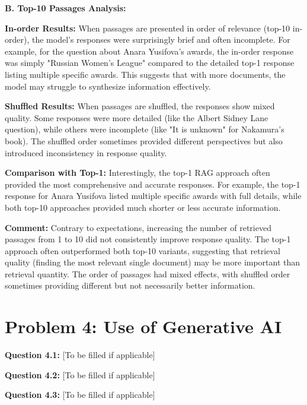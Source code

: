 \documentclass[11pt]{article}
\begin{document}
\textbf{B. Top-10 Passages Analysis:}

\textbf{In-order Results:} When passages are presented in order of relevance (top-10 in-order), the model's responses were surprisingly brief and often incomplete. For example, for the question about Anara Yusifova's awards, the in-order response was simply "Russian Women's League" compared to the detailed top-1 response listing multiple specific awards. This suggests that with more documents, the model may struggle to synthesize information effectively.

\textbf{Shuffled Results:} When passages are shuffled, the responses show mixed quality. Some responses were more detailed (like the Albert Sidney Lane question), while others were incomplete (like "It is unknown" for Nakamura's book). The shuffled order sometimes provided different perspectives but also introduced inconsistency in response quality.

\textbf{Comparison with Top-1:} Interestingly, the top-1 RAG approach often provided the most comprehensive and accurate responses. For example, the top-1 response for Anara Yusifova listed multiple specific awards with full details, while both top-10 approaches provided much shorter or less accurate information.

\textbf{Comment:} Contrary to expectations, increasing the number of retrieved passages from 1 to 10 did not consistently improve response quality. The top-1 approach often outperformed both top-10 variants, suggesting that retrieval quality (finding the most relevant single document) may be more important than retrieval quantity. The order of passages had mixed effects, with shuffled order sometimes providing different but not necessarily better information.

\section{Problem 4: Use of Generative AI}

\textbf{Question 4.1:} [To be filled if applicable]

\textbf{Question 4.2:} [To be filled if applicable]

\textbf{Question 4.3:} [To be filled if applicable]
\end{document}
